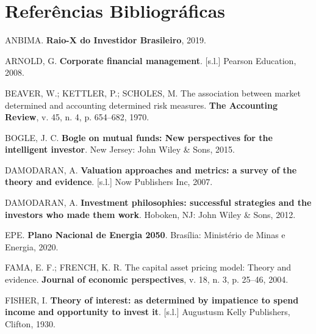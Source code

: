 \documentclass[grad,numbers]{coppe}
\newenvironment{cslreferences}%
  {}%
  {\par}
\begin{document}
  \backmatter

  \hypertarget{referuxeancias-bibliogruxe1ficas}{%
  \chapter*{Referências Bibliográficas}\label{referuxeancias-bibliogruxe1ficas}}


  \label{bib:begin}
  \noindent

  \setlength{\parindent}{-0.20in}
  \setlength{\leftskip}{0.20in}
  \setlength{\parskip}{8pt}

  \hypertarget{refs}{}
  \begin{cslreferences}
  \leavevmode\hypertarget{ref-anbima2019}{}%
  ANBIMA. \textbf{Raio-X do Investidor Brasileiro}, 2019.

  \leavevmode\hypertarget{ref-arnold2008}{}%
  ARNOLD, G. \textbf{Corporate financial management}. {[}s.l.{]} Pearson Education, 2008.

  \leavevmode\hypertarget{ref-beaver1970}{}%
  BEAVER, W.; KETTLER, P.; SCHOLES, M. The association between market determined and accounting determined risk measures. \textbf{The Accounting Review}, v. 45, n. 4, p. 654--682, 1970.

  \leavevmode\hypertarget{ref-bogle2015}{}%
  BOGLE, J. C. \textbf{Bogle on mutual funds: New perspectives for the intelligent investor}. New Jersey: John Wiley \& Sons, 2015.

  \leavevmode\hypertarget{ref-damodaran2007}{}%
  DAMODARAN, A. \textbf{Valuation approaches and metrics: a survey of the theory and evidence}. {[}s.l.{]} Now Publishers Inc, 2007.

  \leavevmode\hypertarget{ref-damodaran2012}{}%
  DAMODARAN, A. \textbf{Investment philosophies: successful strategies and the investors who made them work}. Hoboken, NJ: John Wiley \& Sons, 2012.

  \leavevmode\hypertarget{ref-epe2020}{}%
  EPE. \textbf{Plano Nacional de Energia 2050}. Brasília: Ministério de Minas e Energia, 2020.

  \leavevmode\hypertarget{ref-fama2004}{}%
  FAMA, E. F.; FRENCH, K. R. The capital asset pricing model: Theory and evidence. \textbf{Journal of economic perspectives}, v. 18, n. 3, p. 25--46, 2004.

  \leavevmode\hypertarget{ref-fisher1930}{}%
  FISHER, I. \textbf{Theory of interest: as determined by impatience to spend income and opportunity to invest it}. {[}s.l.{]} Augustusm Kelly Publishers, Clifton, 1930.


\end{cslreferences}
\end{document}
